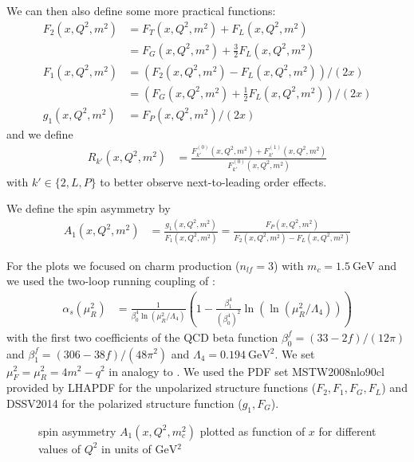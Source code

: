 We can then also define some more practical functions:
\begin{align}
F_{2}(x,Q^2,m^2) &= F_{T}(x,Q^2,m^2) + F_{L}(x,Q^2,m^2)\\
 &= F_{G}(x,Q^2,m^2) + \frac 3 2 F_{L}(x,Q^2,m^2)\\
F_1(x,Q^2,m^2) &= (F_{2}(x,Q^2,m^2)-F_L(x,Q^2,m^2))/(2x)\\
 &= \left(F_{G}(x,Q^2,m^2)+\frac 1 2 F_{L}(x,Q^2,m^2)\right)/(2x)\\
g_1(x,Q^2,m^2) &= F_{P}(x,Q^2,m^2)/(2x)
\end{align}
and we define
\begin{align}
R_{k'}(x,Q^2,m^2) &= \frac{F_{k'}^{(0)}(x,Q^2,m^2)+F_{k'}^{(1)}(x,Q^2,m^2)}{F_{k'}^{(0)}(x,Q^2,m^2)}
\end{align}
with $k'\in\{2,L,P\}$ to better observe next-to-leading order effects.

We define the spin asymmetry by
\begin{align}
A_1(x,Q^2,m^2) &= \frac{g_1(x,Q^2,m^2)}{F_1(x,Q^2,m^2)} = \frac{F_P(x,Q^2,m^2)}{F_2(x,Q^2,m^2)-F_L(x,Q^2,m^2)}
\end{align}

For the plots we focused on charm production ($n_{lf}=3$) with $m_c=\SI{1.5}{\GeV}$ and we used the two-loop running coupling of \cite{Altarelli:1988qr}:
\begin{align}
\alpha_s(\mu_R^2) &= \frac{1}{\beta_{0}^4\ln(\mu_R^2/\Lambda_4)}\left(1-\frac{\beta_1^4}{(\beta_0^4)^2} \ln(\ln(\mu_R^2/\Lambda_4))\right)
\end{align}
with the first two coefficients of the QCD beta function $\beta_0^f=(33-2f)/(12\pi)$ and $\beta_1^f=(306-38f)/(48\pi^2)$ and $\Lambda_4=\SI{0.194}{\GeV^2}$. We set $\mu_F^2=\mu_R^2=4m^2-q^2$ in analogy to \cite{Laenen1993162}. We used the PDF set MSTW2008nlo90cl\cite{Martin:2009iq,Martin:2009bu,Martin:2010db} provided by LHAPDF\cite{LHAPDF6} for the unpolarized structure functions ($F_2,F_1,F_G,F_L$) and DSSV2014\cite{PhysRevLett.113.012001} for the polarized structure function ($g_1,F_G$).


\begin{figure}[ht!]
\centering

\caption{spin asymmetry $A_{1}(x,Q^2,m_c^2)$ plotted as function of $x$ for different values of $Q^2$ in units of $\si{\GeV^2}$}\label{fig:A}
\end{figure}

